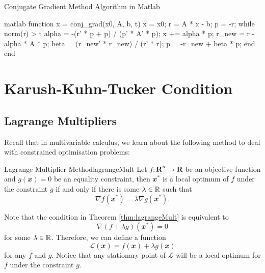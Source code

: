 \documentclass[math, code]{amznotes}
\theoremstyle{remark}
\begin{document}
\begin{codebox}{Conjugate Gradient Method Algorithm in Matlab}{}
    \begin{amzcode}{matlab}
function x = conj_grad(x0, A, b, t)
    x = x0;
    r = A * x - b;
    p = -r;
    while norm(r) > t
        alpha = -(r' * p + p) / (p' * A' * p);
        x += alpha * p;
        r_new = r - alpha * A * p;
        beta = (r_new' * r_new) / (r' * r);
        p = -r_new + beta * p;
    end
end
    \end{amzcode}
\end{codebox}
\chapter{Karush-Kuhn-Tucker Condition}
\section{Lagrange Multipliers}
Recall that in multivariable calculus, we learn about the following method to deal with constrained optimisation problems:
\begin{thmbox}{Lagrange Multiplier Method}{lagrangeMult}
    Let $f \colon \mathbf{R}^n \to \mathbf{R}$ be an objective function and $g(\mathbfit{x}) = 0$ be an equality constraint, then $\mathbfit{x}^*$ is a local optimum of $f$ under the constraint $g$ if and only if there is some $\lambda \in \mathbb{R}$ such that
    \begin{equation*}
        \nabla f(\mathbfit{x}^*) = \lambda \nabla g(\mathbfit{x}^*).
    \end{equation*}
\end{thmbox}
Note that the condition in Theorem \ref{thm:lagrangeMult} is equivalent to 
\begin{equation*}
    \nabla \left(f + \lambda g\right)(\mathbfit{x}^*) = \mathbfit{0}
\end{equation*}
for some $\lambda \in \mathbb{R}$. Therefore, we can define a function 
\begin{equation*}
    \mathcal{L}(\mathbfit{x}) = f(\mathbfit{x}) + \lambda g(\mathbfit{x})
\end{equation*}
for any $f$ and $g$. Notice that any stationary point of $\mathcal{L}$ will be a local optimum for $f$ under the constraint $g$.
\end{document}

